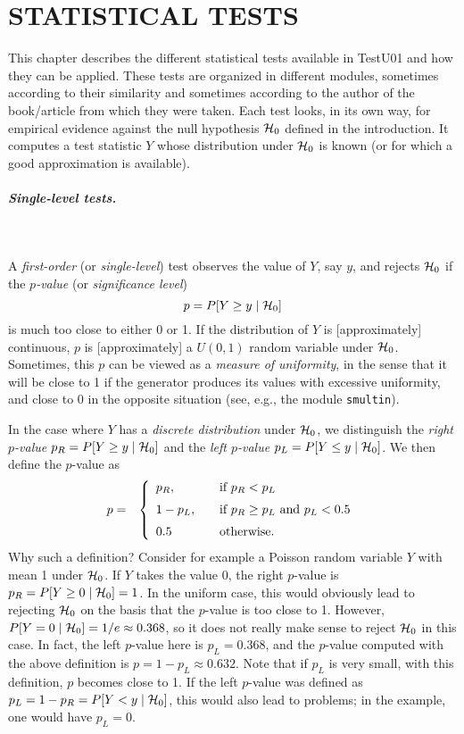 \chapter{STATISTICAL TESTS}

This chapter describes the different statistical tests available
in TestU01 and how they can be applied.
These tests are organized in different modules,
sometimes according to their similarity and
sometimes according to the author of the book/article from which they
were taken.
Each test looks, in its own way, for empirical evidence against
the null hypothesis $\mathcal{H}_0$ defined in the introduction.
It computes a test statistic $Y$ whose distribution under $\mathcal{H}_0$
is known (or for which a good approximation is available).

\paragraph*{Single-level tests.} \

A {\em first-order\/} (or {\em single-level\/}) test
observes the value of $Y$, say $y$,
and rejects $\mathcal{H}_0$ if the {\em $p$-value\/}
(or {\em significance level\/})
 $$ p = P[Y \ge y \mid \mathcal{H}_0] $$
is much too close to either 0 or 1.
If the distribution of $Y$ is [approximately] continuous,
$p$ is [approximately]
a $U(0,1)$ random variable under $\mathcal{H}_0$.
Sometimes, this $p$ can be viewed as a {\em measure of uniformity},
in the sense that it will be close to 1 if the generator produces
its values with excessive uniformity, and close to 0 in the opposite
situation (see, e.g., the module {\tt smultin}).

In the case where $Y$ has a
 {\em discrete distribution\/}
under $\mathcal{H}_0$, we distinguish the {\em right $p$-value\/}
$p_R =  P[Y \ge y \mid \mathcal{H}_0]$ and the {\em left $p$-value\/}
$p_L =  P[Y \le y \mid \mathcal{H}_0]$.  We then define the $p$-value as
\begin{eqnarray*}
   p & = & \left\{
 \begin{array}{l@{\qquad}l}
      p_R, & \mbox{if } p_R <  p_L \\[6pt]
  1 - p_L, & \mbox{if } p_R \ge p_L \mbox{ and } p_L < 0.5 \\[6pt]
      0.5  &         \mbox{otherwise.}
 \end{array}\right.
\end{eqnarray*}
Why such a definition?
Consider for example a Poisson random variable $Y$ with mean 1
under $\mathcal{H}_0$.  If $Y$ takes the value 0, the right $p$-value is
$p_R =  P[Y \ge 0 \mid \mathcal{H}_0] = 1$.  In the uniform case, this would
obviously lead to rejecting $\mathcal{H}_0$ on the basis that the
$p$-value is too close to 1.
However, $P[Y = 0 \mid \mathcal{H}_0] = 1/e \approx 0.368$, so it does not
really make sense to reject $\mathcal{H}_0$ in this case.
In fact, the left $p$-value here is $p_L = 0.368$, and the $p$-value
computed with the above definition is $p = 1 - p_L \approx 0.632$.
Note that if $p_L$ is very small, with this definition, $p$ becomes
close to 1.
If the left $p$-value was defined as
$p_L = 1 - p_R = P[Y < y \mid \mathcal{H}_0]$, this would also lead to problems;
in the example, one would have $p_L = 0$.

